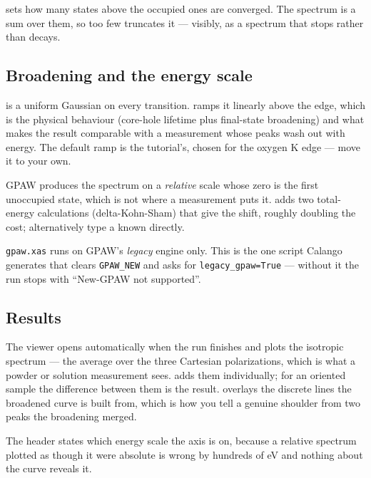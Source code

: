  sets how many states above the occupied ones are
converged. The spectrum is a sum over them, so too few truncates it --- visibly,
as a spectrum that stops rather than decays.

\subsection{Broadening and the energy scale}

 is a uniform Gaussian on every transition.
 ramps it linearly above the edge, which is
the physical behaviour (core-hole lifetime plus final-state broadening) and what
makes the result comparable with a measurement whose peaks wash out with energy.
The default ramp is the tutorial's, chosen for the oxygen K edge --- move it to
your own.

GPAW produces the spectrum on a \emph{relative} scale whose zero is the first
unoccupied state, which is not where a measurement puts it.
 adds two total-energy calculations
(delta-Kohn-Sham) that give the shift, roughly doubling the cost; alternatively
type a known  directly.

\begin{calnote}
\texttt{gpaw.xas} runs on GPAW's \emph{legacy} engine only. This is the one
script Calango generates that clears \texttt{GPAW\_NEW} and asks for
\texttt{legacy\_gpaw=True} --- without it the run stops with ``New-GPAW not
supported''.
\end{calnote}

\subsection{Results}

The viewer opens automatically when the run finishes and plots the isotropic
spectrum --- the average over the three Cartesian polarizations, which is what a
powder or solution measurement sees. 
adds them individually; for an oriented sample the difference between them is
the result.  overlays the discrete lines the
broadened curve is built from, which is how you tell a genuine shoulder from two
peaks the broadening merged.

The header states which energy scale the axis is on, because a relative spectrum
plotted as though it were absolute is wrong by hundreds of eV and nothing about
the curve reveals it.

